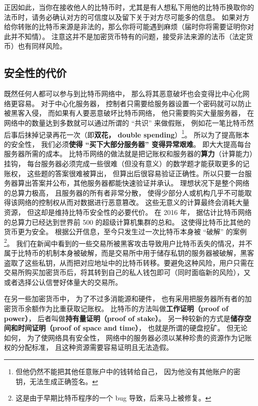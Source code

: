 正因如此，当你在接收他人的比特币时，尤其是有人想私下用他的比特币换取你的法币时，请务必确认对方的可信度以及留下关于对方尽可能多的信息。 如果对方给你转账的比特币来源是非法的，那么你将可能遇到麻烦（届时你将需要证明你对此并不知情）。 注意这并不是加密货币特有的问题，接受非法来源的法币（法定货币）也有同样风险。

\subsection{安全性的代价}
既然任何人都可以参与到比特币网络中， 那么将其恶意破坏也会变得比中心化网络更容易。 对于中心化服务器， 控制者只需要给服务器设置一个密码就可以防止被黑客入侵， 而如果有人要恶意破坏比特币网络， 他只需要购买大量服务器， 在网络中的数量达到多数就可以通过所谓的 “共识” 来做假账， 例如花一笔比特币然后事后抹掉记录再花一次（即\textbf{双花， double spending}）\footnote{但他仍然不能把其他任意账户中的钱转给自己， 因为他没有其他账户的密钥，无法生成正确签名。}。 所以为了提高账本的安全性， 我们必须\textbf{使得 “买下大部分服务器” 变得异常艰难}。 即大大提高每台服务器所需的成本。 比特币网络的做法就是把记账权和服务器的\textbf{算力}（计算能力）挂钩， 每台服务器必须完成一些很难（但没有意义）的数学题才能获取更多的记账权， 这些题的答案很难被算出， 但算出后很容易验证正确性。所以只要一台服务器算出答案并公布，其他服务器都能快速验证并承认。 理想状况下是整个网络的总算力极高， 且服务器的所有者非常分散， 使得少部分人或机构几乎不可能取得该网络的控制权从而对数据进行恶意篡改。 这些无意义的计算最终会消耗大量资源， 但这却是维持比特币安全性的必要代价。 在 2016 年， 据估计比特币网络的总算力已经达到世界前 500 的超级计算机集群的总和。 这使得比特币比其他的货币更为安全。 根据公开信息，至今只发生过一次比特币本身被 “破解” 的案例\footnote{这是由于早期比特币程序的一个 bug 导致，后来马上被修复。}。 我们在新闻中看到的一些交易所被黑客攻击导致用户比特币丢失的情况，并不属于比特币的机制本身被破解，而是交易所中用于储存私钥的服务器被破解，黑客盗取了这些私钥，从而把对应地址中的比特币转移。要避免这种风险，用户只需在交易所购买加密货币后，将其转到自己的私人钱包即可（同时面临新的风险），又或者选择公认信誉好体量大的交易所。

在另一些加密货币中， 为了不过多消能源和硬件， 也有采用把服务器所有者的加密货币余额作为比重获取记账权。 比特币的方法叫做\textbf{工作证明（proof of power）}， 后者叫做\textbf{持有量证明（proof of stake）}。 另一种较新的方式是\textbf{储存空间和时间证明（proof of space and time）}， 也就是所谓的硬盘挖矿。 但无论如何， 为了使网络具有安全性， 网络中的服务器必须以某种珍贵的资源作为记账权的分配标准， 且这种资源需要容易证明且无法造假。

